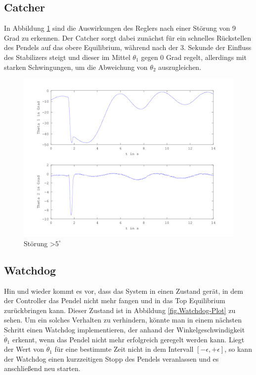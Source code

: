 \subsection{Catcher}
In Abbildung \ref{fig.Catcher-Plot} sind die Auswirkungen des Reglers nach einer Störung von 9 Grad zu erkennen. Der Catcher sorgt dabei zunächst für ein schnelles Rückstellen des Pendels auf das obere Equilibrium, während nach der 3. Sekunde der Einfluss des Stabilizers steigt und dieser im Mittel $\theta_1$ gegen 0 Grad regelt, allerdings mit starken Schwingungen, um die Abweichung von $\theta_2$ auszugleichen. 
\begin{figure}[htbp]
	\centering
	\includegraphics[width=1.\textwidth]{Grafiken/Catch_kurz.png}
	\caption{Störung \textgreater $5^{\circ}$}
	\label{fig.Catcher-Plot}
\end{figure}

\subsection{Watchdog}
Hin und wieder kommt es vor, dass das System in einen Zustand gerät, in dem der Controller das Pendel nicht mehr fangen und in das Top Equilibrium zurückbringen kann. Dieser Zustand ist in Abbildung \ref{fig.Watchdog-Plot} zu sehen. Um ein solches Verhalten zu verhindern, könnte man in einem nächsten Schritt einen Watchdog implementieren, der anhand der Winkelgeschwindigkeit $\dot{\theta}_1$ erkennt, wenn das Pendel nicht mehr erfolgreich geregelt werden kann. Liegt der Wert von $\dot{\theta}_1$ für eine bestimmte Zeit nicht in dem Intervall $[-\epsilon,+\epsilon]$, so kann der Watchdog einen kurzzeitigen Stopp des Pendels veranlassen und es anschließend neu starten.

